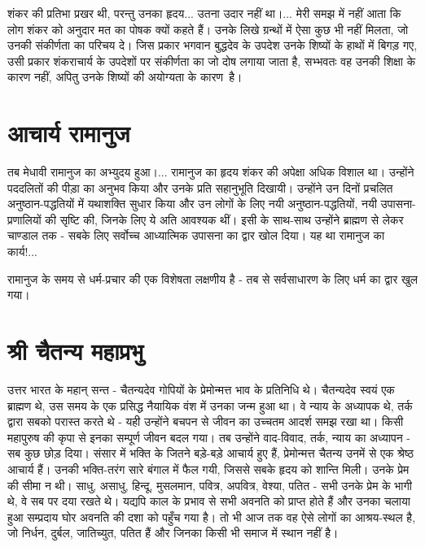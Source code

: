 शंकर की प्रतिभा प्रखर थी, परन्तु उनका हृदय... उतना उदार नहीं था।... मेरी समझ में नहीं आता कि लोग शंकर को अनुदार मत का पोषक क्यों कहते हैं। उनके लिखे ग्रन्थों में ऐसा कुछ भी नहीं मिलता, जो उनकी संकीर्णता का परिचय दे। जिस प्रकार भगवान बुद्धदेव के उपदेश उनके शिष्यों के हाथों में बिगड़ गए, उसी प्रकार शंकराचार्य के उपदेशों पर संकीर्णता का जो दोष लगाया जाता है, सभ्भवतः वह उनकी शिक्षा के कारण नहीं, अपितु उनके शिष्यों की अयोग्यता के कारण~है।


\section*{आचार्य रामानुज}


तब मेधावी रामानुज का अभ्युदय हुआ।... रामानुज का हृदय शंकर की अपेक्षा अधिक विशाल था। उन्होंने पददलितों की पीड़ा का अनुभव किया और उनके प्रति सहानुभूति दिखायी। उन्होंने उन दिनों प्रचलित अनुष्ठान-पद्धतियों में यथाशक्ति सुधार किया और उन लोगों के लिए नयी अनुष्ठान-पद्धतियों, नयी उपासना-प्रणालियों की सृष्टि की, जिनके लिए ये अति आवश्यक थीं। इसी के साथ-साथ उन्होंने ब्राह्मण से लेकर चाण्डाल तक - सबके लिए सर्वोच्च आध्यात्मिक उपासना का द्वार खोल दिया। यह था रामानुज का कार्य!... 

रामानुज के समय से धर्म-प्रचार की एक विशेषता लक्षणीय है - तब से सर्वसाधारण के लिए धर्म का द्वार खुल गया।


\section*{श्री चैतन्य महाप्रभु}


उत्तर भारत के महान् सन्त - चैतन्यदेव गोपियों के प्रेमोन्मत्त भाव के प्रतिनिधि थे। चैतन्यदेव स्वयं एक ब्राह्मण थे, उस समय के एक प्रसिद्ध नैयायिक वंश में उनका जन्म हुआ था। वे न्याय के अध्यापक थे, तर्क द्वारा सबको परास्त करते थे - यही उन्होंने बचपन से जीवन का उच्चतम आदर्श समझ रखा था। किसी महापुरुष की कृपा से इनका सम्पूर्ण जीवन बदल गया। तब उन्होंने वाद-विवाद, तर्क, न्याय का अध्यापन - सब कुछ छोड़ दिया। संसार में भक्ति के जितने बड़े-बड़े आचार्य हुए हैं, प्रेमोन्मत्त चैतन्य उनमें से एक श्रेष्ठ आचार्य हैं। उनकी भक्ति-तरंग सारे बंगाल में फैल गयी, जिससे सबके हृदय को शान्ति मिली। उनके प्रेम की सीमा न थी। साधु, असाधु, हिन्दू, मुसलमान, पवित्र, अपवित्र, वेश्या, पतित - सभी उनके प्रेम के भागी थे, वे सब पर दया रखते थे। यद्यपि काल के प्रभाव से सभी अवनति को प्राप्त होते हैं और उनका चलाया हुआ सम्प्रदाय घोर अवनति की दशा को पहुँच गया है। तो भी आज तक वह ऐसे लोगों का आश्रय-स्थल है, जो निर्धन, दुर्बल, जातिच्युत, पतित हैं और जिनका किसी भी समाज में स्थान नहीं है। 

